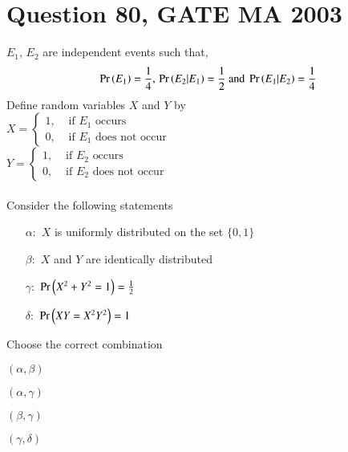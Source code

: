 \documentclass[journal,12pt,twocolumn]{IEEEtran}
\begin{document}
\section*{Question 80, GATE MA 2003}
$E_1$, $E_2$ are independent events such that,
\begin{align*}
    \Pr\left(E_1\right) = \frac{1}{4},\,\Pr\left(E_2|E_1\right) = \frac{1}{2} \text{ and } \Pr\left(E_1|E_2\right) = \frac{1}{4}
\end{align*}
Define random variables $X$ and $Y$ by\\
$X=
\begin{cases}
1, &\text{ if $E_1$ occurs}\\
0, &\text{ if $E_1$ does not occur}
\end{cases}$
\\$Y=
\begin{cases}
1, &\text{ if $E_2$ occurs}\\
0, &\text{ if $E_2$ does not occur}
\end{cases}$
\\\\
Consider the following statements
\begin{itemize}
    \item[$\alpha:$]$X$ is uniformly distributed on the set $\{0,1\}$
    \item[$\beta:$]$X$ and $Y$ are identically distributed
    \item[$\gamma:$]$\Pr\left(X^2 + Y^2 = 1\right) = \frac{1}{2}$
    \item[$\delta:$]$\Pr\left(XY=X^2Y^2\right) = 1$
\end{itemize}
Choose the correct combination
\begin{enumerate}[label = (\alph*)]
\begin{multicols}{2}
\setlength\itemsep{2em}
    \item $(\alpha,\beta)$
    \item $(\alpha,\gamma)$
    \item $(\beta,\gamma)$
    \item $(\gamma,\delta)$
\end{multicols}
\end{enumerate}
\end{document}
